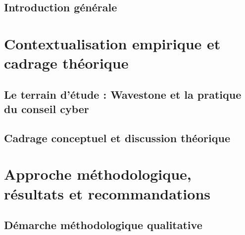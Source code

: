 \documentclass{tnreport}
\begin{document}
\setcounter{page}{1}

\chapter*{Introduction générale}
\setcounter{secnumdepth}{0}

\setcounter{secnumdepth}{3}
\cleardoublepage{}

\part{Contextualisation empirique et cadrage théorique}

\chapter{Le terrain d'étude : Wavestone et la pratique du conseil cyber}


\chapter{Cadrage conceptuel et discussion théorique}


\cleardoublepage{}

\part{Approche méthodologique, résultats et recommandations}

\chapter{Démarche méthodologique qualitative}

\end{document}
